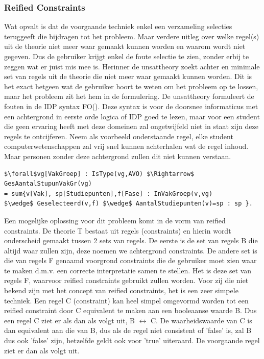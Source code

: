 \subsubsection{Reified Constraints}
\label{sec:reifiedconstraints}
Wat opvalt is dat de voorgaande techniek enkel een verzameling selecties teruggeeft die bijdragen tot het probleem. Maar verdere uitleg over welke regel(s) uit de theorie niet meer waar gemaakt kunnen worden en waarom wordt niet gegeven. Dus de gebruiker krijgt enkel de foute selectie te zien, zonder erbij te zeggen wat er juist mis mee is. Herinner de unsattheory zoekt achter en minimale set van regels uit de theorie die niet meer waar gemaakt kunnen worden. Dit is het exact hetgeen wat de gebruiker hoort te weten om het probleem op te lossen, maar het probleem zit het hem in de formulering. De unsattheory formuleert de fouten in de IDP syntax FO(\textperiodcentered). Deze syntax is voor de doorsnee informaticus met een achtergrond in eerste orde logica of IDP goed te lezen, maar voor een student die geen ervaring heeft met deze domeinen zal ongetwijfeld niet in staat zijn deze regels te ontcijferen. Neem als voorbeeld onderstaande regel, elke student computerwetenschappen zal vrij snel kunnen achterhalen wat de regel inhoud. Maar personen zonder deze achtergrond zullen dit niet kunnen verstaan.
\lstset{basicstyle=\scriptsize}
\begin{lstlisting}[mathescape, caption=IDP Rule Example, frame=single]
$\forall$vg[VakGroep] : IsType(vg,AVO) $\Rightarrow$ GesAantalStupunVakGr(vg) 
= sum{v[Vak], sp[Studiepunten],f[Fase] : InVakGroep(v,vg) 
$\wedge$ Geselecteerd(v,f) $\wedge$ AantalStudiepunten(v)=sp : sp }.
\end{lstlisting}
Een mogelijke oplossing voor dit probleem komt in de vorm van reified constraints. De theorie T bestaat uit regels (constraints) en hierin wordt onderscheid gemaakt tussen 2 sets van regels. De eerste is de set van regels B die altijd waar zullen zijn, deze noemen we achtergrond constraints. De andere set is die van regels F genaamd voorgrond constraints die de gebruiker moet zien waar te maken d.m.v. een correcte interpretatie samen te stellen. Het is deze set van regels F, waarvoor reified constraints gebruikt zullen worden. Voor zij die niet bekend zijn met het concept van reified constraints, het is een zeer simpele techniek. Een regel C (constraint) kan heel simpel omgevormd worden tot een reified constraint door C equivalent te maken aan een booleaanse waarde B. Dus een regel C ziet er als dan als volgt uit, B $\leftrightarrow$ C. De waarheidswaarde van C is dan equivalent aan die van B, dus als de regel niet consistent of 'false' is, zal B dus ook 'false' zijn, hetzelfde geldt ook voor 'true' uiteraard. De voorgaande regel ziet er dan als volgt uit. 
